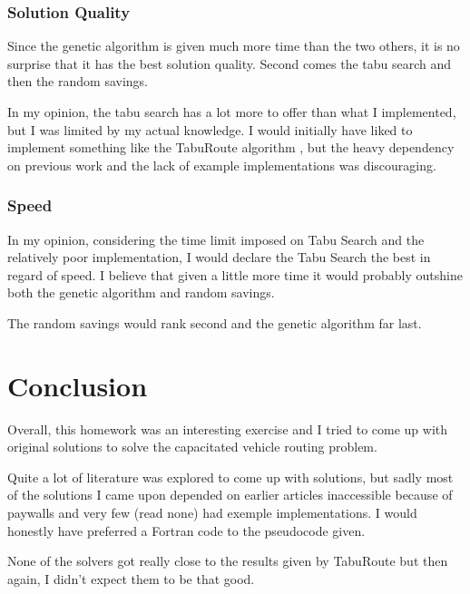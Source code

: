 \documentclass{article} %
\begin{document}
{\subsubsection{Solution Quality}

Since the genetic algorithm is given much more time than the two others, it is no surprise that it has the best solution quality. Second comes the tabu search and then the random savings.\newline

In my opinion, the tabu search has a lot more to offer than what I implemented, but I was limited by my actual knowledge. I would initially have liked to implement something like the TabuRoute algorithm \citep{taburoute}, but the heavy dependency on previous work and the lack of example implementations was discouraging.\newline


\subsubsection{Speed}

In my opinion, considering the time limit imposed on Tabu Search and the relatively poor implementation, I would declare the Tabu Search the best in regard of speed. I believe that given a little more time it would probably outshine both the genetic algorithm and random savings.\newline

The random savings would rank second and the genetic algorithm far last.


\section{Conclusion}

Overall, this homework was an interesting exercise and I tried to come up with original solutions to solve the capacitated vehicle routing problem.\newline

Quite a lot of literature was explored to come up with solutions, but sadly most of the solutions I came upon depended on earlier articles inaccessible because of paywalls and very few (read none) had exemple implementations. I would honestly have preferred a Fortran code to the pseudocode given.\newline

None of the solvers got really close to the results given by TabuRoute \citep{taburoute} but then again, I didn't expect them to be that good.\newline


}
\end{document}
